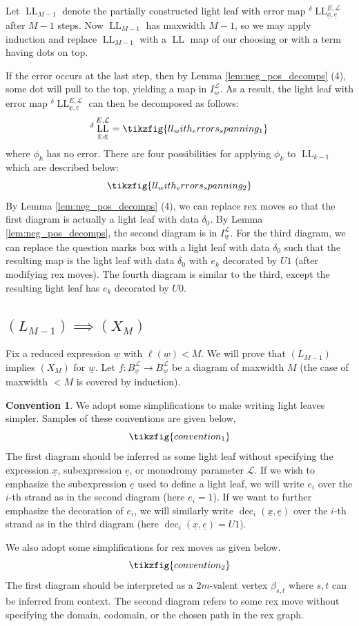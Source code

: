 \documentclass{amsart}
\newcommand{\scrL}{\mathcal{L}}
\DeclareMathOperator{\LL}{LL}
\DeclareMathOperator{\dec}{dec}
\newcommand{\ue}{\underline{e}}
\newcommand{\uw}{\underline{w}}
\newcommand{\ux}{\underline{x}}
\theoremstyle{definition}
\newtheorem{convention}[subsubsection]{Convention}
\numberwithin{equation}{subsection}
\begin{document}
Let $\LL_{M-1}$ denote the partially constructed light leaf with error map ${}^{\delta} \LL_{\ux, \ue}^{E, \scrL}$ after $M-1$ steps.
Now $\LL_{M-1}$ has maxwidth $M-1$, so we may apply induction and replace $\LL_{M-1}$ with a $\LL$ map of our choosing or with a term having dots on top.

If the error occurs at the last step, then by Lemma \ref{lem:neg_pos_decomps} (4), some dot will pull to the top, yielding a map in $I_{\uw}^{\scrL}$.
As a result, the light leaf with error map ${}^{\delta} \LL_{\ux, \ue}^{E, \scrL}$ can then be decomposed as follows:
\[{}^{\delta} \LL_{\ux, \ue}^{E, \scrL} = \tikzfig{ll_with_errors_spanning_1}\]
where $\phi_k$ has no error. There are four possibilities for applying $\phi_k$ to $\LL_{k-1}$ which are described below:
\[\tikzfig{ll_with_errors_spanning_2}\]
By Lemma \ref{lem:neg_pos_decomps} (4), we can replace rex moves so that the first diagram is actually a light leaf with data $\delta_0$.
By Lemma \ref{lem:neg_pos_decomps}, the second diagram is in $I_{\uw}^{\scrL}$.
For the third diagram, we can replace the question marks box with a light leaf with data $\delta_0$ such that the resulting map is the light leaf with data $\delta_0$ with $e_k$ decorated by $U1$ (after modifying rex moves).
The fourth diagram is similar to the third, except the resulting light leaf has $e_k$ decorated by $U0$.

\subsection{\texorpdfstring{$(L_{M-1}) \implies (X_M)$}{LM-1 implies XM}}

Fix a reduced expression $\uw$ with $\ell (\uw) < M$. We will prove that $(L_{M-1})$ implies $(X_M)$ for $\uw$.
Let $f : B_{\ux}^{\scrL} \to B_{\uw}^{\scrL}$ be a diagram of maxwidth $M$ (the case of maxwidth $< M$ is covered by induction).

\begin{convention}
    We adopt some simplifications to make writing light leaves simpler. Samples of these conventions are given below,
    \[\tikzfig{convention_1}\]
    The first diagram should be inferred as some light leaf without specifying the expression $\ux$, subexpression $\ue$, or monodromy parameter $\scrL$.
    If we wish to emphasize the subexpression $\ue$ used to define a light leaf, we will write $e_i$ over the $i$-th strand as in the second diagram (here $e_i = 1$). 
    If we want to further emphasize the decoration of $e_i$, we will similarly write $\dec_i (\ux, \ue)$ over the $i$-th strand as in the third diagram (here $\dec_i (\ux, \ue) = U1$).  

    We also adopt some simplifications for rex moves as given below.
    \[\tikzfig{convention_2}\]
    The first diagram should be interpreted as a $2m$-valent vertex $\beta_{s,t}$ where $s,t$ can be inferred from context.
    The second diagram refers to some rex move without specifying the domain, codomain, or the chosen path in the rex graph.
\end{convention}
\end{document}

